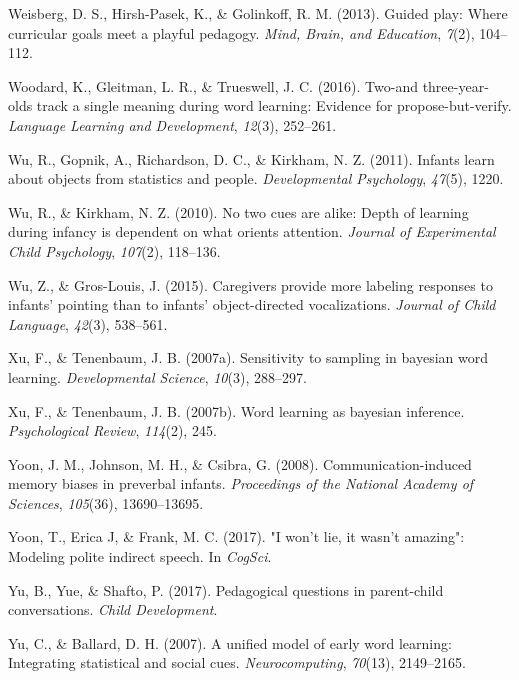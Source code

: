 \documentclass[oneside]{report}
\begin{document}
\leavevmode\hypertarget{ref-weisberg2013guided}{}%
Weisberg, D. S., Hirsh-Pasek, K., \& Golinkoff, R. M. (2013). Guided
play: Where curricular goals meet a playful pedagogy. \emph{Mind, Brain,
and Education}, \emph{7}(2), 104--112.

\leavevmode\hypertarget{ref-woodard2016two}{}%
Woodard, K., Gleitman, L. R., \& Trueswell, J. C. (2016). Two-and
three-year-olds track a single meaning during word learning: Evidence
for propose-but-verify. \emph{Language Learning and Development},
\emph{12}(3), 252--261.

\leavevmode\hypertarget{ref-wu2011infants}{}%
Wu, R., Gopnik, A., Richardson, D. C., \& Kirkham, N. Z. (2011). Infants
learn about objects from statistics and people. \emph{Developmental
Psychology}, \emph{47}(5), 1220.

\leavevmode\hypertarget{ref-wu2010no}{}%
Wu, R., \& Kirkham, N. Z. (2010). No two cues are alike: Depth of
learning during infancy is dependent on what orients attention.
\emph{Journal of Experimental Child Psychology}, \emph{107}(2),
118--136.

\leavevmode\hypertarget{ref-wu2015caregivers}{}%
Wu, Z., \& Gros-Louis, J. (2015). Caregivers provide more labeling
responses to infants' pointing than to infants' object-directed
vocalizations. \emph{Journal of Child Language}, \emph{42}(3), 538--561.

\leavevmode\hypertarget{ref-xu2007sampling}{}%
Xu, F., \& Tenenbaum, J. B. (2007a). Sensitivity to sampling in bayesian
word learning. \emph{Developmental Science}, \emph{10}(3), 288--297.

\leavevmode\hypertarget{ref-xu2007word}{}%
Xu, F., \& Tenenbaum, J. B. (2007b). Word learning as bayesian
inference. \emph{Psychological Review}, \emph{114}(2), 245.

\leavevmode\hypertarget{ref-yoon2008communication}{}%
Yoon, J. M., Johnson, M. H., \& Csibra, G. (2008). Communication-induced
memory biases in preverbal infants. \emph{Proceedings of the National
Academy of Sciences}, \emph{105}(36), 13690--13695.

\leavevmode\hypertarget{ref-yoonwon}{}%
Yoon, T., Erica J, \& Frank, M. C. (2017). "I won't lie, it wasn't
amazing": Modeling polite indirect speech. In \emph{CogSci}.

\leavevmode\hypertarget{ref-yu2017peagogical}{}%
Yu, B., Yue, \& Shafto, P. (2017). Pedagogical questions in parent-child
conversations. \emph{Child Development}.

\leavevmode\hypertarget{ref-yu2007unified}{}%
Yu, C., \& Ballard, D. H. (2007). A unified model of early word
learning: Integrating statistical and social cues.
\emph{Neurocomputing}, \emph{70}(13), 2149--2165.
\end{document}
